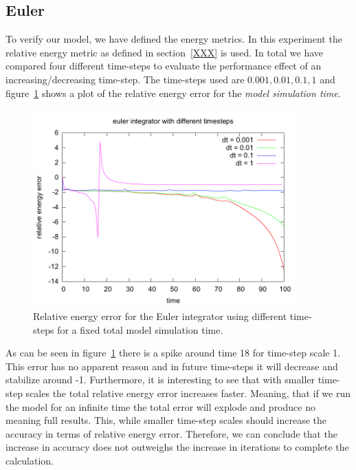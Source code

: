 \documentclass[11pt]{article} %
\begin{document}
\subsection{Euler}
\label{sec:res:euler}
To verify our model, we have defined the energy metrics. In this experiment the relative energy metric as defined in section~\ref{XXX} is used. In total we have compared four different time-steps to evaluate the performance effect of an increasing/decreasing time-step. The time-steps used are $0.001, 0.01, 0.1, 1$ and figure~\ref{fig:euler} shows a plot of the relative energy error for the \textit{model simulation time}. 
\begin{figure}
    \includegraphics[width=0.9\textwidth]{euler_different_timesteps.png}
    \caption{Relative energy error for the Euler integrator using different time-steps for a fixed total model simulation time.}
    \label{fig:euler}
\end{figure}
As can be seen in figure~\ref{fig:euler} there is a spike around time 18 for time-step scale 1. This error has no apparent reason and in future time-steps it will decrease and stabilize around -1. Furthermore, it is interesting to see that with smaller time-step scales the total relative energy error increases faster. Meaning, that if we run the model for an infinite time the total error will explode and produce no meaning full results. This, while smaller time-step scales should increase the accuracy in terms of relative energy error. Therefore, we can conclude that the increase in accuracy does not outweighs the increase in iterations to complete the calculation. 
\end{document}
